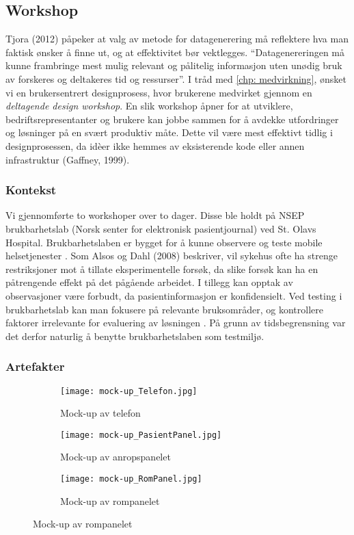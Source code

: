 \subsection{Workshop}
\label{workshops}

Tjora (2012) påpeker at valg av metode for datagenerering må reflektere hva man faktisk ønsker å finne ut, og at effektivitet bør vektlegges. “Datagenereringen må kunne frambringe mest mulig relevant og pålitelig informasjon uten unødig bruk av forskeres og deltakeres tid og ressurser”.
I tråd med \ref{chp: medvirkning}, ønsket vi en brukersentrert designprosess, hvor brukerene medvirket gjennom en \emph{deltagende design workshop}.
En slik workshop åpner for at utviklere, bedriftsrepresentanter og brukere kan jobbe sammen for å avdekke utfordringer og løsninger på en svært produktiv måte. Dette vil være mest effektivt tidlig i designprosessen, da idèer ikke hemmes av eksisterende kode eller annen infrastruktur (Gaffney, 1999).

\subsubsection{Kontekst}
Vi gjennomførte to workshoper over to dager. Disse ble holdt på NSEP brukbarhetslab (Norsk senter for elektronisk pasientjournal) ved St. Olavs Hospital. Brukbarhetslaben er bygget for å kunne observere og teste mobile helsetjenester \cite{NSEP}.
Som Alsos og Dahl (2008) beskriver, vil sykehus ofte ha strenge restriksjoner mot å tillate eksperimentelle forsøk, da slike forsøk kan ha en påtrengende effekt på det pågående arbeidet. I tillegg kan opptak av observasjoner være forbudt, da pasientinformasjon er konfidensielt. Ved testing i brukbarhetslab kan man fokusere på relevante bruksområder, og kontrollere faktorer irrelevante for evaluering av løsningen \cite{Alsos08}. På grunn av tidsbegrensning var det derfor naturlig å benytte brukbarhetslaben som testmiljø.   


\subsubsection{Artefakter}
\begin{figure}[H]
	\centering
	\begin{subfigure}[b]{0.25\textwidth}
		\centering
		\texttt{[image: mock-up\_Telefon.jpg]}
		\caption{Mock-up av telefon}
		\label{mock-up_Telefon}
	\end{subfigure}
	\begin{subfigure}[b]{0.35\textwidth}
		\centering
		\texttt{[image: mock-up\_PasientPanel.jpg]}
		\caption{Mock-up av anropspanelet}
		\label{mock-up_PasientPanel}
	\end{subfigure}
	\begin{subfigure}[b]{0.35\textwidth}
		\centering
		\texttt{[image: mock-up\_RomPanel.jpg]}
		\caption{Mock-up av rompanelet}
		\label{mock-up_RomPanel}
	\end{subfigure}
\end{figure}


